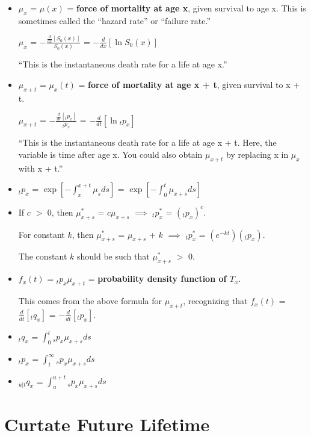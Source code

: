 \documentclass[]{book}
\begin{document}
\begin{itemize}
\item
  \(\mu_x\) = \(\mu(x)\) = \textbf{force of mortality at age x}, given
  survival to age x. This is sometimes called the ``hazard rate'' or
  ``failure rate.''

  \(\mu_x\) = \(-\frac{\frac{d}{dx}[S_0(x)]}{S_0(x)}\) =
  \(-\frac{d}{dx}[\ln S_0(x)]\)

  ``This is the instantaneous death rate for a life at age x.''
\item
  \(\mu_{x + t}\) = \(\mu_x(t)\) = \textbf{force of mortality at age x +
  t}, given survival to x + t.

  \(\mu_{x + t}\) = \(-\frac{\frac{d}{dt}[{}_{t}p_x]}{{}_{t}p_x}\) =
  \(-\frac{d}{dt}[\ln {}_{t}p_x]\)

  ``This is the instantaneous death rate for a life at age x + t. Here,
  the variable is time after age x. You could also obtain
  \(\mu_{x + t}\) by replacing x in \(\mu_x\) with x + t.''
\item
  \({}_{t}p_x\) = \(\exp[-\int^{x + t}_x \mu_sds]\) =
  \(\exp[-\int^{t}_0 \mu_{x + s}ds]\)
\item
  If \(c\) \(>\) 0, then \(\mu^{*}_{x + s}\) = \(c\mu_{x + s}\)
  \(\implies\) \({}_{t}p^{*}_x\) = \(({}_{t}p_x)^{c}\).

  For constant \(k\), then \(\mu^{*}_{x + s}\) = \(\mu_{x + s}\) + \(k\)
  \(\implies\) \({}_{t}p^{*}_x\) = \((e^{-kt})({}_{t}p_x)\).

  The constant \(k\) should be such that \(\mu^{*}_{x + s}\) \(>\) 0.
\item
  \(f_x(t)\) = \({}_{t}p_x\)\(\mu_{x + t}\) = \textbf{probability
  density function of \(T_x\)}.

  This comes from the above formula for \(\mu_{x + t}\), recognizing
  that \(f_x(t)\) = \(\frac{d}{dt}[{}_{t}q_x]\) =
  \(-\frac{d}{dt}[{}_{t}p_x]\).
\item
  \({}_{t}q_x\) = \(\int^t_0 {}_{s}p_x\)\(\mu_{x + s} ds\)
\item
  \({}_{t}p_x\) = \(\int^{\infty}_t {}_{s}p_x\)\(\mu_{x + s} ds\)
\item
  \({}_{u|t}q_x\) = \(\int^{u+t}_u {}_{s}p_x\mu_{x + s}ds\)
\end{itemize}

\section{Curtate Future Lifetime}\label{curtate-future-lifetime}
\end{document}

